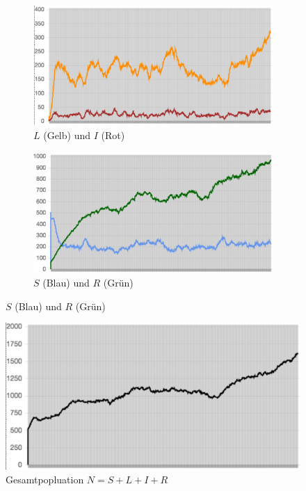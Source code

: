 \documentclass[paper=a4, fontsize=11pt, ngerman, abstract=on]{scrartcl}
\numberwithin{equation}{section} %
\numberwithin{figure}{section} %
\numberwithin{table}{section} %
\begin{document}
\begin{figure}[ht]
  \centering
  \begin{subfigure}{.45\textwidth}
    \centering
    \includegraphics[width=.99\linewidth]{images/abm-l-i-exp-1}
    \caption{$L$ (Gelb) und $I$ (Rot)}
    \label{fig:abm-l-i-exp-1}
  \end{subfigure}%
  \begin{subfigure}{.45\textwidth}
    \centering
    \includegraphics[width=.99\linewidth]{images/abm-s-r-exp-1}
    \caption{$S$ (Blau) und $R$ (Grün)}
    \label{fig:abm-s-r-exp-1}
  \end{subfigure}
\end{figure}
\begin{figure}[ht]
  \centering
  \includegraphics[width=.5\textwidth]{images/abm-n-exp-1}
  \caption{Gesamtpopluation $N = S + L + I + R$}
  \label{fig:abm-n-exp-1}
\end{figure}
\end{document}
